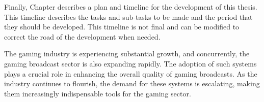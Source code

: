     Finally, Chapter  describes a plan and timeline for the development of this thesis. This timeline describes the tasks and sub-tasks to be made and the period that they should be developed. This timeline is not final and can be modified to correct the road of the development when needed.

    The gaming industry is experiencing substantial growth, and concurrently, the gaming broadcast sector is also expanding rapidly. The adoption of such systems plays a crucial role in enhancing the overall quality of gaming broadcasts. As the industry continues to flourish, the demand for these systems is escalating, making them increasingly indispensable tools for the gaming sector.

    
